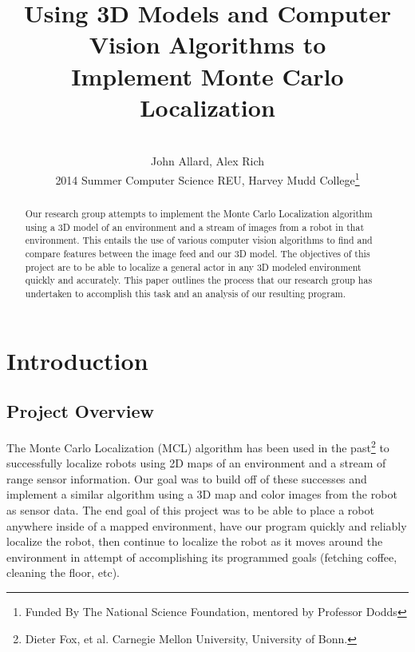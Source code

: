 \documentclass[a4paper,11pt]{article}
\title{Using 3D Models and Computer Vision Algorithms to \\ Implement Monte Carlo Localization}
\author{ \\[7in]  John Allard, Alex Rich \\ 2014 Summer Computer Science REU, Harvey Mudd College\thanks{Funded By The National Science Foundation, mentored by Professor Dodds}}
\begin{document}
  \maketitle   
  \newpage  
  
  \tableofcontents
  \newpage

  \begin{abstract}  
  Our research group attempts to implement the Monte Carlo Localization algorithm using a 3D model of an environment and a stream of images from a robot in that environment. This entails the use of various computer vision algorithms to find and compare features between the image feed and our 3D model. The objectives of this project are to be able to localize a general actor in any 3D modeled environment quickly and accurately. This paper outlines the process that our research group has undertaken to accomplish this task and an analysis of our resulting program. 
  \end{abstract}
  
  \section{Introduction} 

  \subsection{Project Overview}
  The Monte Carlo Localization (MCL) algorithm has been used in the past\footnote{ Dieter Fox, et al. Carnegie Mellon University, University of Bonn.} to successfully localize robots using 2D maps of an environment and a stream of range sensor information. Our goal was to build off of these successes and implement a similar algorithm using a 3D map and color images from the robot as sensor data. The end goal of this project was to be able to place a robot anywhere inside of a mapped environment, have our program quickly and reliably localize the robot, then continue to localize the robot as it moves around the environment in attempt of accomplishing its programmed goals (fetching coffee, cleaning the floor, etc).
\end{document}

